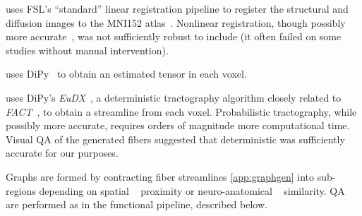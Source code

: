 \documentclass[11pt]{article}
\begin{document}
\begin{multicols}{2}
\begin{description}[style=unboxed,leftmargin=0cm]
        \item[Registration] uses FSL's ``standard'' linear registration pipeline %
        to register the structural and diffusion images to the MNI152 atlas~\cite{fsl1,fsl2,fsl3,mni152}. Nonlinear registration, though possibly more accurate~\cite{klein,lddmm}, was not sufficiently robust to include (it often failed on some studies without manual intervention).
    

        \item[Tensor Estimation] uses DiPy~\cite{dipy}
        to obtain an estimated tensor in each voxel. %
        \item[Tractography] uses DiPy's \textit{EuDX}~\cite{eudx}, a deterministic tractography algorithm closely related to \textit{FACT}~\cite{fact}, to obtain a streamline from each voxel. %
        Probabilistic tractography, while possibly more accurate, requires orders of magnitude more computational time.  Visual QA of the generated fibers suggested that deterministic was sufficiently accurate for our purposes. 
        \item[Graph Generation] Graphs are formed by contracting fiber streamlines \ref{app:graphgen} into sub-regions depending on spatial ~\cite{glocal} proximity or neuro-anatomical ~\cite{aal, desikan, harvardoxford, talairach, jhu, glasser, pvt, slab907, slab1068} similarity. QA are performed as in the functional pipeline,  described below.
\end{description}




\end{multicols}
\end{document}
